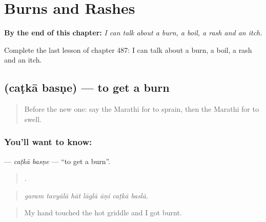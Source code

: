 
\chapter{Burns and Rashes}
\label{ch:mr-burns-and-rashes}

\begin{chapteropening}
\textbf{By the end of this chapter:} \emph{I can talk about a burn, a boil, a rash and an itch.}

Complete the last lesson of chapter 487: I can talk about a burn, a boil, a rash and an itch.
\end{chapteropening}

\section[\texorpdfstring{\mr{चटका} \mr{बसणे} (caṭkā basṇe)}{चटका बसणे (caṭkā basṇe)}]{  (caṭkā basṇe) — to get a burn}

\label{lesson:MR-C487-catka-basne}



\begin{quote}
Before the new one: say the Marathi for to sprain, then the Marathi for to swell.
\end{quote}

\subsection*{You'll want to know:  }
\textbf{ } — \emph{caṭkā basṇe} — \textquotedblleft{}to get a burn\textquotedblright{}.

\begin{quote}
      .
\end{quote}

\begin{quote}
\emph{garam tavyālā hāt lāglā āṇi caṭkā baslā.}
\end{quote}

\begin{quote}
My hand touched the hot griddle and I got burnt.
\end{quote}

